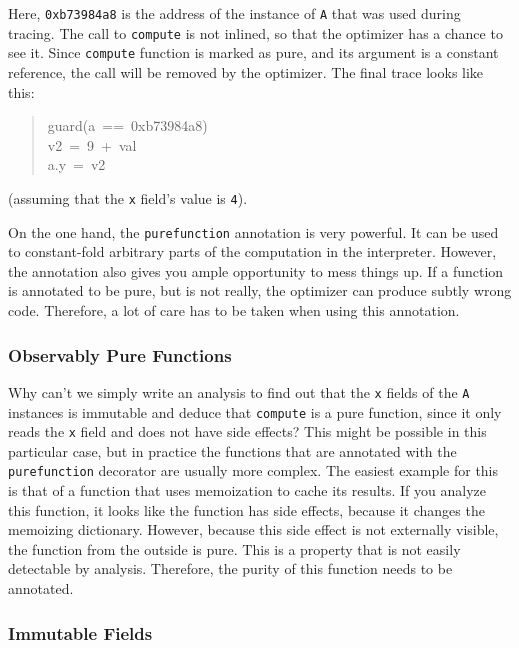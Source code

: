 \documentclass{sig-alternate}
\begin{document}
Here, \texttt{0xb73984a8} is the address of the instance of \texttt{A} that was used
during tracing. The call to \texttt{compute} is not inlined, so that the optimizer
has a chance to see it. Since \texttt{compute} function is marked as pure, and its
argument
is a constant reference, the call will be removed by the optimizer. The final
trace looks like this:
%
\begin{quote}{\ttfamily \raggedright \noindent
guard(a~==~0xb73984a8)\\
v2~=~9~+~val\\
a.y~=~v2
}
\end{quote}

(assuming that the \texttt{x} field's value is \texttt{4}).

On the one hand, the \texttt{purefunction} annotation is very powerful. It can be
used to constant-fold arbitrary parts of the computation in the interpreter.
However, the annotation also gives you ample opportunity to mess things up. If a
function is annotated to be pure, but is not really, the optimizer can produce
subtly wrong code. Therefore, a lot of care has to be taken when using this
annotation.


\subsubsection{Observably Pure Functions}

Why can't we simply write an analysis to find out that the \texttt{x} fields of the
\texttt{A} instances is immutable and deduce that \texttt{compute} is a pure function,
since it only reads the \texttt{x} field and does not have side effects? This might
be possible in this particular case, but in practice the functions that are
annotated with the \texttt{purefunction} decorator are usually more complex.
The easiest example for this is that of a function that uses memoization to
cache its results. If you analyze this function, it looks like the function has
side effects, because it changes the memoizing dictionary. However, because this side
effect is not externally visible, the function from the outside is pure. This is
a property that is not easily detectable by analysis. Therefore, the purity
of this function needs to be annotated.



\subsubsection{Immutable Fields}
\end{document}

